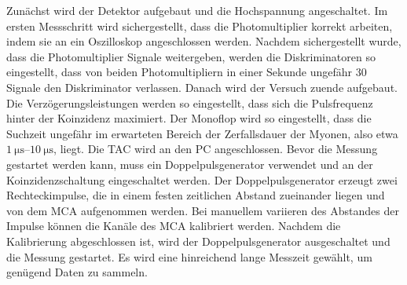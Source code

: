 Zunächst wird der Detektor aufgebaut und die Hochspannung angeschaltet.
Im ersten Messschritt wird sichergestellt, dass die Photomultiplier korrekt arbeiten, indem sie an ein Oszilloskop angeschlossen werden.
Nachdem sichergestellt wurde, dass die Photomultiplier Signale weitergeben, werden die Diskriminatoren so eingestellt, dass von beiden Photomultipliern in einer Sekunde ungefähr 30 Signale den Diskriminator verlassen.
Danach wird der Versuch zuende aufgebaut.
Die Verzögerungsleistungen werden so eingestellt, dass sich die Pulsfrequenz hinter der Koinzidenz maximiert.
Der Monoflop wird so eingestellt, dass die Suchzeit ungefähr im erwarteten Bereich der Zerfallsdauer der Myonen, also etwa $\SIrange{1}{10}{\micro\second}$, liegt.
Die TAC wird an den PC angeschlossen.\newline
Bevor die Messung gestartet werden kann, muss ein Doppelpulsgenerator verwendet und an der Koinzidenzschaltung eingeschaltet werden.
Der Doppelpulsgenerator erzeugt zwei Rechteckimpulse, die in einem festen zeitlichen Abstand zueinander liegen und von dem MCA aufgenommen werden.
Bei manuellem variieren des Abstandes der Impulse können die Kanäle des MCA kalibriert werden.
Nachdem die Kalibrierung abgeschlossen ist, wird der Doppelpulsgenerator ausgeschaltet und die Messung gestartet.
Es wird eine hinreichend lange Messzeit gewählt, um genügend Daten zu sammeln.